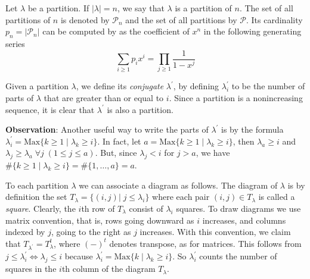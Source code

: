 \begin{dang}
    \begin{definition}
        Let $\lambda$ be a partition. If $|\lambda|=n$, we say that $\lambda$ is a partition of $n$. The set of all partitions of $n$ is denoted by $\mathcal{P}_n$ and the set of all partitions by $\mathcal{P}$. Its cardinality $p_n=|\mathcal{P}_n|$ can be computed by as the coefficient of $x^n$ in the following generating series
        \begin{equation}
            \sum_{i\geq1}p_ix^i = \prod_{j\geq1}\frac{1}{1-x^j}
        \end{equation}
    \end{definition}
\end{dang}
\begin{dang}
    \begin{definition}\cite{macdonald1998symmetric}
        Given a partition $\lambda$, we define its \textit{conjugate} $\lambda^\prime$, by defining $\lambda_i^\prime$ to be the number of parts of $\lambda$ that are greater than or equal to $i$. Since a partition is a nonincreasing sequence, it is clear that $\lambda^\prime$ is also a partition.
    \end{definition}
\end{dang}
\begin{dang}
    \textbf{Observation}: Another useful way to write the parts of $\lambda^\prime$ is by the formula $\lambda_i^\prime=\text{Max}\{k\geq1\;|\;\lambda_k\geq i\}$. In fact, let $a=\text{Max}\{k\geq1\;|\;\lambda_k\geq i\}$, then $\lambda_a\geq i$ and $\lambda_j\geq\lambda_a\;\forall j\;(1\leq j\leq a)$. But, since $\lambda_j<i$ for $j>a$, we have $\#\{k\geq1\;|\;\lambda_k\geq i\}=\#\{1,\dots,a\}=a$. 
\end{dang}
To each partition $\lambda$ we can associate a diagram as follows. The diagram of $\lambda$ is by definition the set $T_{\lambda}=\{(i,j)|\;j\leq\lambda_i\}$ where each pair $(i,j)\in T_\lambda$ is called a \textit{square}. Clearly, the $i$th row of $T_\lambda$ consist of $\lambda_i$ squares. To draw diagrams we use matrix convention, that is, rows going downward as $i$ increases, and columns indexed by $j$, going to the right as $j$ increases. With this convention, we claim that $T_{\lambda^\prime}=T_\lambda^t$, where $(-)^t$ denotes transpose, as for matrices. This follows from  $j\leq\lambda_i^\prime\iff \lambda_j\leq i$ because $\lambda_i^\prime = \text{Max}\{k\;|\;\lambda_k\geq i\}$. So $\lambda_i^\prime$ counts the number of squares in the $i$th column of the diagram $T_\lambda$.
